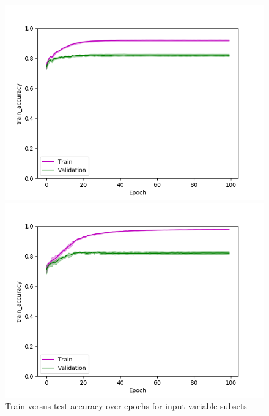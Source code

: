 \def\year{2017}\relax \documentclass[letterpaper]{article}
\begin{document}
\begin{figure}
\begin{minipage}{.24\textwidth}
\caption{$D_2$}\label{fig:d2acctraintest}
\end{minipage}
\begin{minipage}{.24\textwidth}
  \centering
\includegraphics[width=\textwidth]{pics/d3_train_accuracy_mean_train_test.png}
\caption{$D_3$}\label{fig:d3acctraintest}
\end{minipage}
\begin{minipage}{.01\textwidth}
\end{minipage}
\begin{minipage}{.24\textwidth}
  \centering
\includegraphics[width=\textwidth]{pics/d4_train_accuracy_mean_train_test.png}
\caption{$D_4$}\label{fig:d4acctraintest}
\end{minipage}
\caption{Train versus test accuracy over epochs for input variable subsets}\label{fig:traintestacc}
\end{figure}
\end{document}
